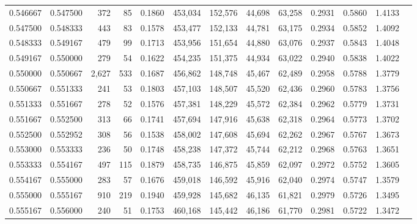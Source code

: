 \begin{tabular}{rrrrrrrrrrrrr}
0.546667 & 0.547500 &   372 &  85 &                                     0.1860 & 453,034 & 152,576 &  44,698 &  63,258 & 0.2931 & 0.5860 & 1.4133 \\
0.547500 & 0.548333 &   443 &  83 &                                     0.1578 & 453,477 & 152,133 &  44,781 &  63,175 & 0.2934 & 0.5852 & 1.4092 \\
0.548333 & 0.549167 &   479 &  99 &                                     0.1713 & 453,956 & 151,654 &  44,880 &  63,076 & 0.2937 & 0.5843 & 1.4048 \\
0.549167 & 0.550000 &   279 &  54 &                                     0.1622 & 454,235 & 151,375 &  44,934 &  63,022 & 0.2940 & 0.5838 & 1.4022 \\
0.550000 & 0.550667 & 2,627 & 533 &                                     0.1687 & 456,862 & 148,748 &  45,467 &  62,489 & 0.2958 & 0.5788 & 1.3779 \\
0.550667 & 0.551333 &   241 &  53 &                                     0.1803 & 457,103 & 148,507 &  45,520 &  62,436 & 0.2960 & 0.5783 & 1.3756 \\
0.551333 & 0.551667 &   278 &  52 &                                     0.1576 & 457,381 & 148,229 &  45,572 &  62,384 & 0.2962 & 0.5779 & 1.3731 \\
0.551667 & 0.552500 &   313 &  66 &                                     0.1741 & 457,694 & 147,916 &  45,638 &  62,318 & 0.2964 & 0.5773 & 1.3702 \\
0.552500 & 0.552952 &   308 &  56 &                                     0.1538 & 458,002 & 147,608 &  45,694 &  62,262 & 0.2967 & 0.5767 & 1.3673 \\
0.553000 & 0.553333 &   236 &  50 &                                     0.1748 & 458,238 & 147,372 &  45,744 &  62,212 & 0.2968 & 0.5763 & 1.3651 \\
0.553333 & 0.554167 &   497 & 115 &                                     0.1879 & 458,735 & 146,875 &  45,859 &  62,097 & 0.2972 & 0.5752 & 1.3605 \\
0.554167 & 0.555000 &   283 &  57 &                                     0.1676 & 459,018 & 146,592 &  45,916 &  62,040 & 0.2974 & 0.5747 & 1.3579 \\
0.555000 & 0.555167 &   910 & 219 &                                     0.1940 & 459,928 & 145,682 &  46,135 &  61,821 & 0.2979 & 0.5726 & 1.3495 \\
0.555167 & 0.556000 &   240 &  51 &                                     0.1753 & 460,168 & 145,442 &  46,186 &  61,770 & 0.2981 & 0.5722 & 1.3472 \\

\end{tabular}
